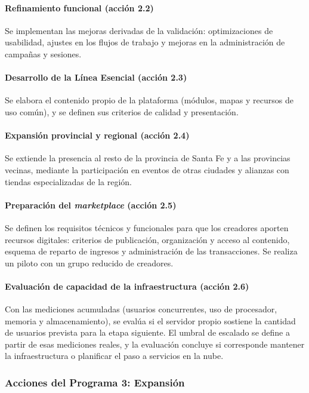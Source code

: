 \paragraph{Refinamiento funcional (acción 2.2)}
Se implementan las mejoras derivadas de la validación: optimizaciones de usabilidad, ajustes en los flujos de trabajo y mejoras en la administración de campañas y sesiones.

\paragraph{Desarrollo de la Línea Esencial (acción 2.3)}
Se elabora el contenido propio de la plataforma (módulos, mapas y recursos de uso común), y se definen sus criterios de calidad y presentación.

\paragraph{Expansión provincial y regional (acción 2.4)}
Se extiende la presencia al resto de la provincia de Santa Fe y a las provincias vecinas, mediante la participación en eventos de otras ciudades y alianzas con tiendas especializadas de la región.

\paragraph{Preparación del \textit{marketplace} (acción 2.5)}
Se definen los requisitos técnicos y funcionales para que los creadores aporten recursos digitales: criterios de publicación, organización y acceso al contenido, esquema de reparto de ingresos y administración de las transacciones. Se realiza un piloto con un grupo reducido de creadores.

\paragraph{Evaluación de capacidad de la infraestructura (acción 2.6)}
Con las mediciones acumuladas (usuarios concurrentes, uso de procesador, memoria y almacenamiento), se evalúa si el servidor propio sostiene la cantidad de usuarios prevista para la etapa siguiente. El umbral de escalado se define a partir de esas mediciones reales, y la evaluación concluye si corresponde mantener la infraestructura o planificar el paso a servicios en la nube.

\subsubsection{Acciones del Programa 3: Expansión}

